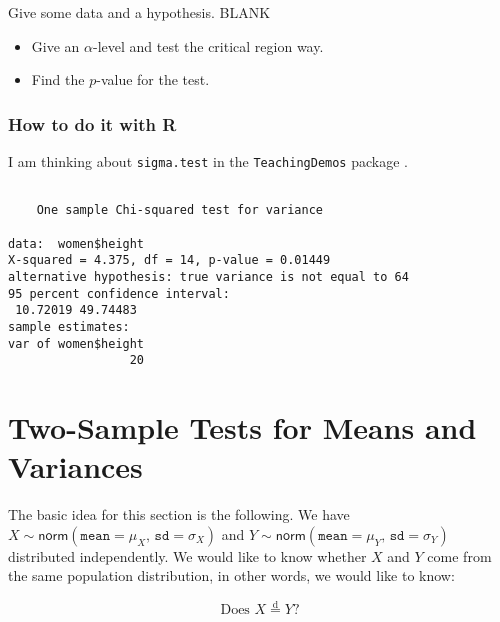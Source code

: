 \documentclass[]{book}
\newenvironment{Shaded}{\begin{snugshade}}{\end{snugshade}}
\newcommand{\KeywordTok}[1]{\textcolor[rgb]{0.13,0.29,0.53}{\textbf{{#1}}}}
\newcommand{\DataTypeTok}[1]{\textcolor[rgb]{0.13,0.29,0.53}{{#1}}}
\newcommand{\DecValTok}[1]{\textcolor[rgb]{0.00,0.00,0.81}{{#1}}}
\newcommand{\NormalTok}[1]{{#1}}
\providecommand{\tightlist}{%
  \setlength{\itemsep}{0pt}\setlength{\parskip}{0pt}}
\numberwithin{equation}{chapter}
\numberwithin{figure}{chapter}
\theoremstyle{plain}
\theoremstyle{definition}
\theoremstyle{remark}
\theoremstyle{definition}
\theoremstyle{definition}
\theoremstyle{remark}
\let\BeginKnitrBlock\begin \let\EndKnitrBlock\end
\begin{document}
\BeginKnitrBlock{example}
\protect\hypertarget{ex:unnamed-chunk-398}{}{\label{ex:unnamed-chunk-398}}Give
some data and a hypothesis. BLANK

\begin{itemize}
\tightlist
\item
  Give an \(\alpha\)-level and test the critical region way.
\item
  Find the \(p\)-value for the test.
\end{itemize}
\EndKnitrBlock{example}

\subsubsection{How to do it with R}\label{how-to-do-it-with-r-41}

I am thinking about \texttt{sigma.test}
 in the \texttt{TeachingDemos}
package \cite{TeachingDemos}.

\begin{Shaded}
\end{Shaded}

\begin{verbatim}

    One sample Chi-squared test for variance

data:  women$height
X-squared = 4.375, df = 14, p-value = 0.01449
alternative hypothesis: true variance is not equal to 64
95 percent confidence interval:
 10.72019 49.74483
sample estimates:
var of women$height 
                 20 
\end{verbatim}

\section{Two-Sample Tests for Means and
Variances}\label{sec-two-sample-tests-for-means}

The basic idea for this section is the following. We have
\(X\sim\mathsf{norm}(\mathtt{mean} = \mu_{X},\,\mathtt{sd} = \sigma_{X})\)
and
\(Y\sim\mathsf{norm}(\mathtt{mean} = \mu_{Y},\,\mathtt{sd} = \sigma_{Y})\)
distributed independently. We would like to know whether \(X\) and \(Y\)
come from the same population distribution, in other words, we would
like to know:

\begin{equation}
\mbox{Does }X\overset{\mathrm{d}}{=}Y?
\end{equation}
\end{document}
